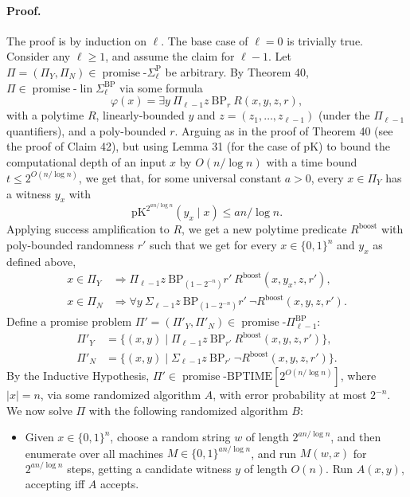 \documentclass[10pt,a4paper]{article}
\begin{document}
\paragraph{Proof.} The proof is by induction on $\ell$. The base case of $\ell=0$ is trivially true. Consider any $\ell\geq1$, and assume the claim for $\ell-1$. Let $\Pi=(\Pi_Y,\Pi_N)\in\operatorname{promise}\text{-}\Sigma_\ell^{\mathrm P}$ be arbitrary. By Theorem 40, $\Pi\in\operatorname{promise}\text{-}\operatorname{lin}\Sigma_\ell^{\mathrm{BP}}$ via some formula
\[\varphi(x)=\exists y\ \Pi_{\ell-1}z\ \mathrm{BP}_r\ R(x,y,z,r),\]
with a polytime $R$, linearly-bounded $y$ and $z=(z_1,\ldots,z_{\ell-1})$ (under the $\Pi_{\ell-1}$ quantifiers), and a poly-bounded $r$.
Arguing as in the proof of Theorem 40 (see the proof of Claim 42), but using Lemma 31 (for the case of pK) to bound the computational depth of an input $x$ by $O(n/\log n)$ with a time bound $t\leq2^{O(n/\log n)}$, we get that, for some universal constant $a>0$, every $x\in\Pi_Y$ has a witness $y_x$ with
\[\mathrm{pK}^{2^{an/\log n}}(y_x\mid x)\leq an/\log n.\tag{27}\]
Applying success amplification to $R$, we get a new polytime predicate $R^{\mathrm{boost}}$ with poly-bounded randomness $r'$ such that we get for every $x\in\{0,1\}^n$ and $y_x$ as defined above,
\begin{align*}
x\in\Pi_Y&\Longrightarrow\Pi_{\ell-1}z\ \mathrm{BP}_{(1-2^{-n})}r'\ R^{\mathrm{boost}}(x,y_x,z,r'),\tag{28}\\
x\in\Pi_N&\Longrightarrow\forall y\ \Sigma_{\ell-1}z\ \mathrm{BP}_{(1-2^{-n})}r'\ \neg R^{\mathrm{boost}}(x,y,z,r').\tag{29}
\end{align*}
Define a promise problem $\Pi'=(\Pi'_Y,\Pi'_N)\in\operatorname{promise}\text{-}\Pi_{\ell-1}^{\mathrm{BP}}$:
\begin{align*}
\Pi'_Y&=\{(x,y)\mid\Pi_{\ell-1}z\ \mathrm{BP}_{r'}\ R^{\mathrm{boost}}(x,y,z,r')\},\\
\Pi'_N&=\{(x,y)\mid\Sigma_{\ell-1}z\ \mathrm{BP}_{r'}\ \neg R^{\mathrm{boost}}(x,y,z,r')\}.
\end{align*}
By the Inductive Hypothesis, $\Pi'\in\operatorname{promise}\text{-}\mathrm{BPTIME}[2^{O(n/\log n)}]$, where $|x|=n$, via some randomized algorithm $A$, with error probability at most $2^{-n}$.
We now solve $\Pi$ with the following randomized algorithm $B$:
\begin{itemize}
\item Given $x\in\{0,1\}^n$, choose a random string $w$ of length $2^{an/\log n}$, and then enumerate over all machines $M\in\{0,1\}^{an/\log n}$, and run $M(w,x)$ for $2^{an/\log n}$ steps, getting a candidate witness $y$ of length $O(n)$. Run $A(x,y)$, accepting iff $A$ accepts.
\end{itemize}
\end{document}
